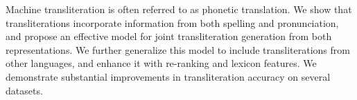 Machine transliteration is often referred to as phonetic translation. We show that transliterations incorporate information from both spelling and pronunciation, and propose an effective model for joint transliteration generation from both representations. We further generalize this model to include transliterations from other languages, and enhance it with re-ranking and lexicon features. We demonstrate substantial improvements in transliteration accuracy on several datasets.
